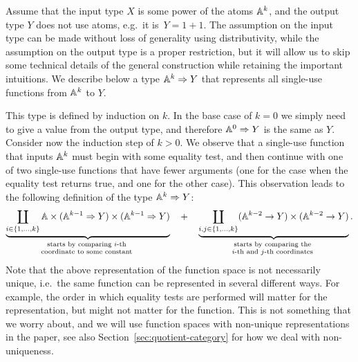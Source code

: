 \begin{example}\label{ex:decision-tree-types} Assume that the input type $X$ is some power of the atoms $\mathbb A^k$, and the output type $Y$ does not use atoms, e.g.~it is~$Y = 1 +1$. The assumption on the input type can be made without loss of generality using distributivity, while the assumption on the output type is a proper restriction, but it will allow us to skip some technical details of the general construction while retaining the important intuitions. 
We describe below a type $\mathbb A^k \Rightarrow Y$ that represents all single-use functions from $\mathbb A^k$ to $Y$. 

This type is defined by  induction on $k$. In the base case of $k=0$ we simply need to give a value from the output type, and therefore $\mathbb A^0 \Rightarrow Y$ is the same as $Y$. Consider now the induction step of $k > 0$.  
    We observe that a single-use function that inputs $\mathbb A^k$ must begin with some equality test, and then continue with one of two single-use functions that have fewer arguments (one for the case when the equality test returns true, and one for the other case). This observation leads to the following definition of the type $\mathbb A^k \Rightarrow Y$:
\begin{align*}
\myunderbrace{ \coprod_{i \in \set{1,\ldots,k}} 
    \atoms \times (\atoms^{k-1} \Rightarrow Y) \times (\atoms^{k-1} \Rightarrow Y)
 }{starts by comparing $i$-th  \\
 coordinate to some constant}  \quad + \quad 
\myunderbrace{\coprod_{i, j \in \set{1,\ldots,k}} (\atoms^{k-2} \to Y) \times (\atoms^{k-2} \to Y)}{
    starts by comparing the \\ 
    $i$-th and $j$-th coordinates}.
\end{align*}
Note that the above representation of the function space is not necessarily unique, i.e.~the same function can be represented in several different ways. For example, the order in which equality tests are performed will matter for the representation, but might not matter for the function. This is not something that we worry about, and we will use function spaces with non-unique representations in the paper, see also Section~\ref{sec:quotient-category} for how we deal with non-uniqueness. \exampleend
\end{example}


